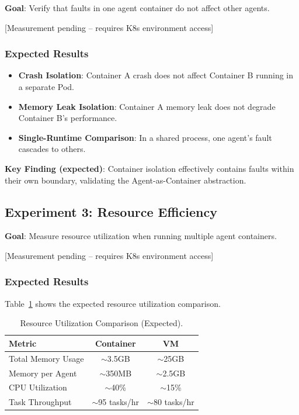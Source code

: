 \textbf{Goal}: Verify that faults in one agent container do not affect other agents.

[Measurement pending -- requires K8s environment access]

\subsubsection{Expected Results}
\begin{itemize}
    \item \textbf{Crash Isolation}: Container A crash does not affect Container B running in a separate Pod.
    \item \textbf{Memory Leak Isolation}: Container A memory leak does not degrade Container B's performance.
    \item \textbf{Single-Runtime Comparison}: In a shared process, one agent's fault cascades to others.
\end{itemize}

\textbf{Key Finding (expected)}: Container isolation effectively contains faults within their own boundary, validating the Agent-as-Container abstraction.

\subsection{Experiment 3: Resource Efficiency}

\textbf{Goal}: Measure resource utilization when running multiple agent containers.

[Measurement pending -- requires K8s environment access]

\subsubsection{Expected Results}
Table~\ref{tab:resource} shows the expected resource utilization comparison.

\begin{table}[htbp]
    \centering
    \caption{Resource Utilization Comparison (Expected).}
    \label{tab:resource}
    \begin{tabular}{@{}lcc@{}}
        \toprule
        \textbf{Metric} & \textbf{Container} & \textbf{VM} \\
        \midrule
        Total Memory Usage & $\sim$3.5GB & $\sim$25GB \\
        Memory per Agent & $\sim$350MB & $\sim$2.5GB \\
        CPU Utilization & $\sim$40\% & $\sim$15\% \\
        Task Throughput & $\sim$95 tasks/hr & $\sim$80 tasks/hr \\
        \bottomrule
    \end{tabular}
\end{table}

